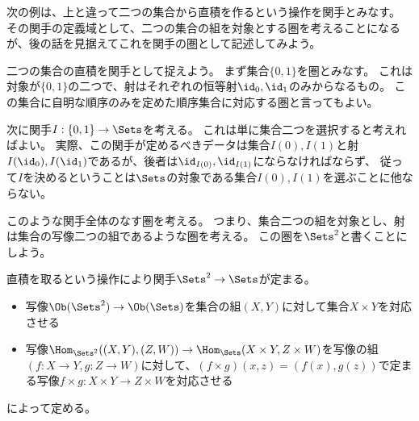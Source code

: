 \documentclass[uplatex]{jsarticle}
\begin{document}
\vspace{10pt}
次の例は、上と違って二つの集合から直積を作るという操作を関手とみなす。
その関手の定義域として、二つの集合の組を対象とする圏を考えることになるが、後の話を見据えてこれを関手の圏として記述してみよう。
\begin{eg}
二つの集合の直積を関手として捉えよう。
まず集合$\{0,1\}$を圏とみなす。
これは対象が$\{0,1\}$の二つで、射はそれぞれの恒等射$\id_0, \id_1$のみからなるもの。
この集合に自明な順序のみを定めた順序集合に対応する圏と言ってもよい。

次に関手$I:\{0,1\} \to \Sets$を考える。
これは単に集合二つを選択すると考えればよい。
実際、この関手が定めるべきデータは集合$I(0), I(1)$と射$I(\id_0), I(\id_1)$であるが、後者は$\id_{I(0)}, \id_{I(1)}$にならなければならず、
従って$I$を決めるということは$\Sets$の対象である集合$I(0), I(1)$を選ぶことに他ならない。

このような関手全体のなす圏を考える。
つまり、集合二つの組を対象とし、射は集合の写像二つの組であるような圏を考える。
この圏を$\Sets^2$と書くことにしよう。

直積を取るという操作により関手$\Sets^2 \to \Sets$が定まる。
\begin{itemize}
\item 写像$\Ob(\Sets^2)\to \Ob(\Sets)$を集合の組$(X,Y)$に対して集合$X \times Y$を対応させる
\item 写像$\Hom_{\Sets^2}((X,Y),(Z,W))\to \Hom_{\Sets}(X\times Y,Z \times W)$を写像の組$(f:X \to Y, g:Z \to W)$に対して、$(f \times g)(x,z)=(f(x), g(z))$で定まる写像$f\times g:X \times Y \to Z \times W$を対応させる
\end{itemize}
によって定める。
\end{eg}
\end{document}
